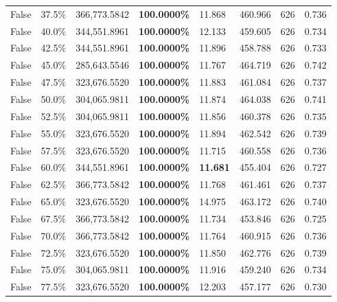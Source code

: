 \begin{table}[H]
\begin{tabular}{lllrllll}
\cline{1-8}
False & 37.5\% & 366,773.5842 & \bfseries \color{red} 100.0000\% & 11.868 & 460.966 & 626 & 0.736 \\
\cline{1-8}
False & 40.0\% & 344,551.8961 & \bfseries \color{red} 100.0000\% & 12.133 & 459.605 & 626 & 0.734 \\
\cline{1-8}
False & 42.5\% & 344,551.8961 & \bfseries \color{red} 100.0000\% & 11.896 & 458.788 & 626 & 0.733 \\
\cline{1-8}
False & 45.0\% & \color{red} 285,643.5546 & \bfseries \color{red} 100.0000\% & 11.767 & 464.719 & 626 & 0.742 \\
\cline{1-8}
False & 47.5\% & 323,676.5520 & \bfseries \color{red} 100.0000\% & 11.883 & 461.084 & 626 & 0.737 \\
\cline{1-8}
False & 50.0\% & 304,065.9811 & \bfseries \color{red} 100.0000\% & 11.874 & 464.038 & 626 & 0.741 \\
\cline{1-8}
False & 52.5\% & 304,065.9811 & \bfseries \color{red} 100.0000\% & 11.856 & 460.378 & 626 & 0.735 \\
\cline{1-8}
False & 55.0\% & 323,676.5520 & \bfseries \color{red} 100.0000\% & 11.894 & 462.542 & 626 & 0.739 \\
\cline{1-8}
False & 57.5\% & 323,676.5520 & \bfseries \color{red} 100.0000\% & 11.715 & 460.558 & 626 & 0.736 \\
\cline{1-8}
False & 60.0\% & 344,551.8961 & \bfseries \color{red} 100.0000\% & \bfseries \color{red} 11.681 & 455.404 & 626 & 0.727 \\
\cline{1-8}
False & 62.5\% & 366,773.5842 & \bfseries \color{red} 100.0000\% & 11.768 & 461.461 & 626 & 0.737 \\
\cline{1-8}
False & 65.0\% & 323,676.5520 & \bfseries \color{red} 100.0000\% & 14.975 & 463.172 & 626 & 0.740 \\
\cline{1-8}
False & 67.5\% & 366,773.5842 & \bfseries \color{red} 100.0000\% & 11.734 & 453.846 & 626 & 0.725 \\
\cline{1-8}
False & 70.0\% & 366,773.5842 & \bfseries \color{red} 100.0000\% & 11.764 & 460.915 & 626 & 0.736 \\
\cline{1-8}
False & 72.5\% & 323,676.5520 & \bfseries \color{red} 100.0000\% & 11.850 & 462.776 & 626 & 0.739 \\
\cline{1-8}
False & 75.0\% & 304,065.9811 & \bfseries \color{red} 100.0000\% & 11.916 & 459.240 & 626 & 0.734 \\
\cline{1-8}
False & 77.5\% & 323,676.5520 & \bfseries \color{red} 100.0000\% & 12.203 & 457.177 & 626 & 0.730 \\

\end{tabular}
\end{table}
